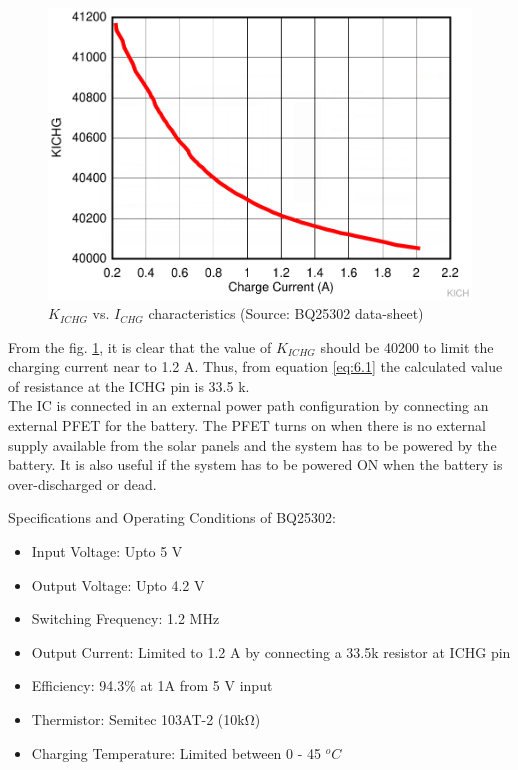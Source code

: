   \begin{center}
 	\begin{figure}[h]
 		\centering
 		\includegraphics[width=0.7\columnwidth]{kich.png}
 		\caption[$K_{ICHG}$ vs. $I_{CHG}$ characteristics]{\centering $K_{ICHG}$ vs. $I_{CHG}$ characteristics (Source: BQ25302 data-sheet)}
 		\label{fig:kichg}
 	\end{figure}
 \end{center}
 From the fig. \ref{fig:kichg}, it is clear that the value of $K_{ICHG}$ should be 40200 to limit the charging current near to 1.2 A. Thus, from equation \ref{eq:6.1} the calculated value of resistance at the ICHG pin is 33.5 k\ohm.
 \\
 
 The IC is connected in an external power path configuration by connecting an external PFET for the battery. The PFET turns on when there is no external supply available from the solar panels and the system has to be powered by the battery. It is also useful if the system has to be powered ON when the battery is over-discharged or dead. 
 
 
 Specifications and Operating Conditions of BQ25302:
\begin{itemize}
 	\item Input Voltage: Upto 5 V
 	\item Output Voltage: Upto 4.2 V
 	\item Switching Frequency: 1.2 MHz
 	\item Output Current: Limited to 1.2 A by connecting a 33.5k resistor at ICHG pin 
 	\item Efficiency: 94.3\% at 1A from 5 V input 
 	\item Thermistor: Semitec 103AT-2 (10\si{\kilo\ohm})
 	\item Charging Temperature: Limited between 0 - 45 $^{o}C$
 \end{itemize}

